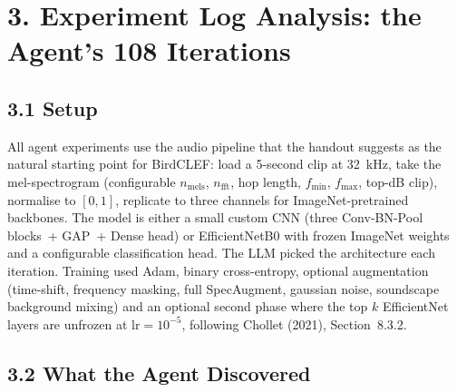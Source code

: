 \documentclass[11pt,a4paper]{article}
\begin{document}
\section*{3. Experiment Log Analysis: the Agent's 108 Iterations}

\subsection*{3.1 Setup}

All agent experiments use the audio pipeline that the handout suggests as the natural starting point for BirdCLEF: load a 5-second clip at 32~kHz, take the mel-spectrogram (configurable $n_{\text{mels}}$, $n_{\text{fft}}$, hop length, $f_{\min}$, $f_{\max}$, top-dB clip), normalise to $[0,1]$, replicate to three channels for ImageNet-pretrained backbones. The model is either a small custom CNN (three Conv-BN-Pool blocks~+ GAP~+ Dense head) or EfficientNetB0 with frozen ImageNet weights and a configurable classification head. The LLM picked the architecture each iteration. Training used Adam, binary cross-entropy, optional augmentation (time-shift, frequency masking, full SpecAugment, gaussian noise, soundscape background mixing) and an optional second phase where the top $k$ EfficientNet layers are unfrozen at $\text{lr}=10^{-5}$, following Chollet (2021), Section~8.3.2.

\subsection*{3.2 What the Agent Discovered}
\end{document}
